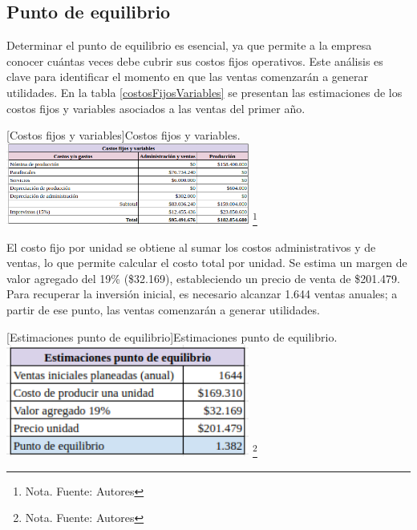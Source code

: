 \subsection{Punto de equilibrio}

Determinar el punto de equilibrio es esencial, ya que permite a la empresa conocer cuántas veces debe cubrir sus costos fijos operativos. Este análisis es clave para identificar el momento en que las ventas comenzarán a generar utilidades. En la tabla \ref{costosFijosVariables} se presentan las estimaciones de los costos fijos y variables asociados a las ventas del primer año.

\vspace{2mm}
\begin{minipage}{0.9\textwidth}
\centering
{}[Costos fijos y variables]{Costos fijos y variables.}
\label{costosFijosVariables}
\includegraphics[width=0.6\textwidth]{Content/Images/AF/PuntoDeEquilibrio_CostosFijosYVar.png}
\footnote{Nota. \textup{Fuente: Autores}}
\end{minipage}

El costo fijo por unidad se obtiene al sumar los costos administrativos y de ventas, lo que permite calcular el costo total por unidad. Se estima un margen de valor agregado del 19\% (\$32.169), estableciendo un precio de venta de \$201.479. Para recuperar la inversión inicial, es necesario alcanzar 1.644 ventas anuales; a partir de ese punto, las ventas comenzarán a generar utilidades.

\vspace{2mm}
\begin{minipage}{0.9\textwidth}
\centering
{}[Estimaciones punto de equilibrio]{Estimaciones punto de equilibrio.}
\label{calculosPuntoEquilirbio}
\includegraphics[width=0.6\textwidth]{Content/Images/AF/PuntoDeEquilibrio_Estimacion.png}
\footnote{Nota. \textup{Fuente: Autores}}
\end{minipage}

